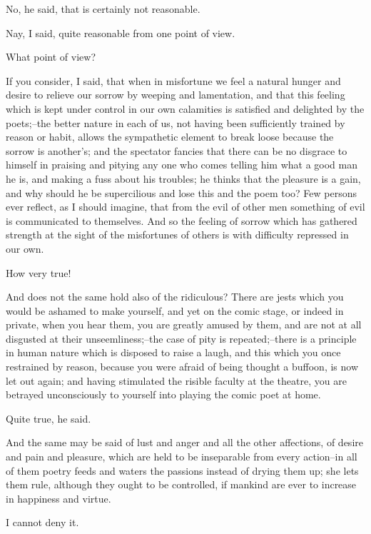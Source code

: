 No, he said, that is certainly not reasonable.

Nay, I said, quite reasonable from one point of view.

What point of view?

If you consider, I said, that when in misfortune we feel a natural
hunger and desire to relieve our sorrow by weeping and lamentation, and
that this feeling which is kept under control in our own calamities is
satisfied and delighted by the poets;--the better nature in each of
us, not having been sufficiently trained by reason or habit, allows the
sympathetic element to break loose because the sorrow is another's;
and the spectator fancies that there can be no disgrace to himself in
praising and pitying any one who comes telling him what a good man he
is, and making a fuss about his troubles; he thinks that the pleasure
is a gain, and why should he be supercilious and lose this and the poem
too? Few persons ever reflect, as I should imagine, that from the evil
of other men something of evil is communicated to themselves. And so
the feeling of sorrow which has gathered strength at the sight of the
misfortunes of others is with difficulty repressed in our own.

How very true!

And does not the same hold also of the ridiculous? There are jests which
you would be ashamed to make yourself, and yet on the comic stage, or
indeed in private, when you hear them, you are greatly amused by them,
and are not at all disgusted at their unseemliness;--the case of pity
is repeated;--there is a principle in human nature which is disposed to
raise a laugh, and this which you once restrained by reason, because you
were afraid of being thought a buffoon, is now let out again; and
having stimulated the risible faculty at the theatre, you are betrayed
unconsciously to yourself into playing the comic poet at home.

Quite true, he said.

And the same may be said of lust and anger and all the other affections,
of desire and pain and pleasure, which are held to be inseparable
from every action--in all of them poetry feeds and waters the passions
instead of drying them up; she lets them rule, although they ought to be
controlled, if mankind are ever to increase in happiness and virtue.

I cannot deny it.

